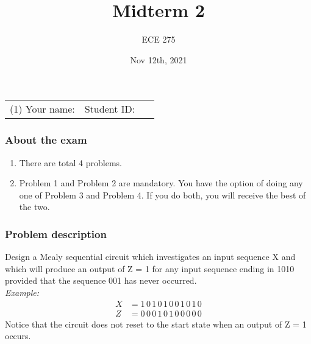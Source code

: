 \documentclass{article}
\title{Midterm 2}
\date{Nov 12th, 2021}
\author{ECE 275}
\begin{document}
\maketitle
\begin{tabular}{p{0.5\linewidth}p{0.5\linewidth}}
(1) Your name:& Student ID: \\
\end{tabular}
\subsubsection*{About the exam}
\begin{enumerate}
  \item There are total 4 problems.
  \item Problem 1 and Problem 2 are mandatory. You have the option of doing any one of Problem 3 and Problem 4. If
    you do both, you will receive the best of the two.
\end{enumerate}
\subsubsection*{Problem description}
Design a Mealy sequential circuit which investigates an input sequence X and which
will produce an output of Z = 1 for any input sequence ending in 1010 provided that
the sequence 001 has never occurred.\\

\textit{Example:}
\begin{align*}
X &= 1\, 0\, 1\, 0\, 1\, 0\, 0\, 1\, 0\, 1\, 0
    \\
Z &= 0\, 0\, 0\, 1\, 0\, 1\, 0\, 0\, 0\, 0\, 0
\end{align*}
Notice that the circuit does not reset to the start state when an output of Z = 1
occurs.
\end{document}
